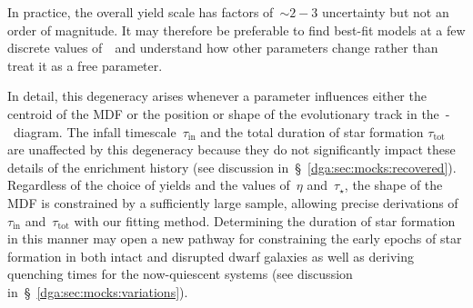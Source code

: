 \documentclass[main.tex]{subfiles}
\begin{document}
In practice, the overall yield scale has factors of~$\sim$$2 - 3$ uncertainty
but not an order of magnitude.
It may therefore be preferable to find best-fit models at a few discrete
values of~\yacc~and understand how other parameters change rather than treat
it as a free parameter.
\par
In detail, this degeneracy arises whenever a parameter influences either the
centroid of the MDF or the position or shape of the evolutionary track in
the~\afe-\feh~diagram.
The infall timescale~$\tau_\text{in}$ and the total duration of star formation
$\tau_\text{tot}$ are unaffected by this degeneracy because they do not
significantly impact these details of the enrichment history (see discussion
in~\S~\ref{dga:sec:mocks:recovered}).
Regardless of the choice of yields and the values of~$\eta$ and~$\tau_\star$,
the shape of the MDF is constrained by a sufficiently large sample, allowing
precise derivations of~$\tau_\text{in}$ and~$\tau_\text{tot}$ with our fitting
method.
Determining the duration of star formation in this manner may open a new
pathway for constraining the early epochs of star formation in both intact
and disrupted dwarf galaxies as well as deriving quenching times for the
now-quiescent systems (see discussion in~\S~\ref{dga:sec:mocks:variations}).
\end{document}
